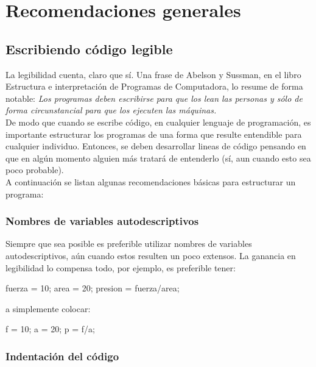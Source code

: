 \chapter{Recomendaciones generales}\label{recomendaciones-generales}

\section{Escribiendo código legible}\label{escribiendo-cuxf3digo-legible}

La legibilidad cuenta, claro que sí. Una frase de Abelson y Sussman, en
el libro Estructura e interpretación de Programas de Computadora, lo
resume de forma notable: \emph{Los programas deben escribirse para que
los lean las personas y sólo de forma circunstancial para que los
ejecuten las máquinas.} \\

De modo que cuando se escribe código, en cualquier lenguaje de
programación, es importante estructurar los programas de una forma que
resulte entendible para cualquier individuo. Entonces, se deben
desarrollar lineas de código pensando en que en algún momento alguien
más tratará de entenderlo (sí, aun cuando esto sea poco probable). \\

A continuación se listan algunas recomendaciones básicas para
estructurar un programa:

\subsection{Nombres de variables autodescriptivos}\label{nombres-de-variables-autodescriptivos}

Siempre que sea posible es preferible utilizar nombres de variables
autodescriptivos, aún cuando estos resulten un poco extensos. La
ganancia en legibilidad lo compensa todo, por ejemplo, es preferible
tener:

\begin{matlab}
fuerza = 10;
area = 20;
presion = fuerza/area;
\end{matlab}

a simplemente colocar:

\begin{matlab}
f = 10;
a = 20;
p = f/a;
\end{matlab}

\subsection{Indentación del código}\label{indentacion-del-codigo}

